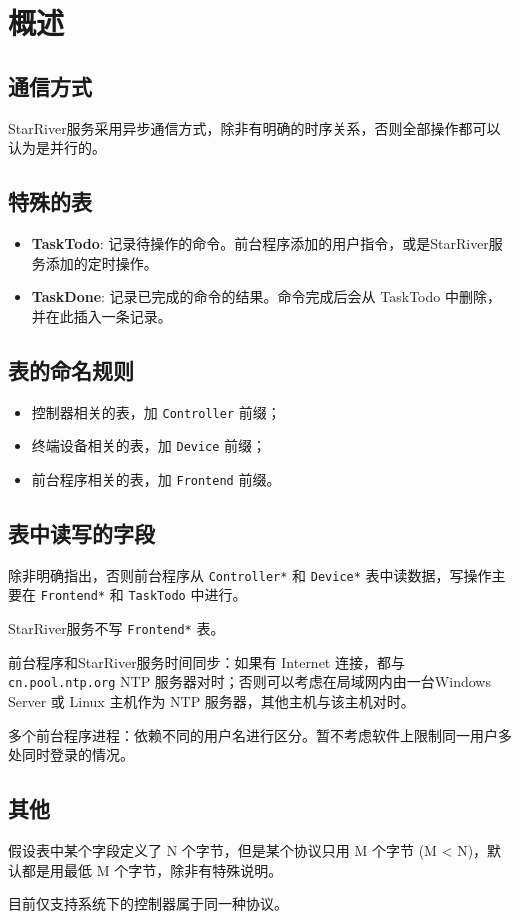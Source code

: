 \section{概述}\label{ux6982ux8ff0}

\subsection{通信方式}\label{ux901aux4fe1ux65b9ux5f0f}

StarRiver服务采用异步通信方式，除非有明确的时序关系，否则全部操作都可以认为是并行的。

\subsection{特殊的表}\label{ux7279ux6b8aux7684ux8868}

\begin{itemize}
\item
  \textbf{TaskTodo}:
  记录待操作的命令。前台程序添加的用户指令，或是StarRiver服务添加的定时操作。
\item
  \textbf{TaskDone}: 记录已完成的命令的结果。命令完成后会从 TaskTodo
  中删除，并在此插入一条记录。
\end{itemize}

\subsection{表的命名规则}\label{ux8868ux7684ux547dux540dux89c4ux5219}

\begin{itemize}
\itemsep1pt\parskip0pt
\item
  控制器相关的表，加 \texttt{Controller} 前缀；
\item
  终端设备相关的表，加 \texttt{Device} 前缀；
\item
  前台程序相关的表，加 \texttt{Frontend} 前缀。
\end{itemize}

\subsection{表中读写的字段}\label{ux8868ux4e2dux8bfbux5199ux7684ux5b57ux6bb5}

除非明确指出，否则前台程序从 \texttt{Controller*} 和 \texttt{Device*}
表中读数据，写操作主要在 \texttt{Frontend*} 和 \texttt{TaskTodo}
中进行。

StarRiver服务不写 \texttt{Frontend*} 表。

前台程序和StarRiver服务时间同步：如果有 Internet 连接，都与
\texttt{cn.pool.ntp.org} NTP
服务器对时；否则可以考虑在局域网内由一台Windows Server 或 Linux 主机作为
NTP 服务器，其他主机与该主机对时。

多个前台程序进程：依赖不同的用户名进行区分。暂不考虑软件上限制同一用户多处同时登录的情况。

\subsection{其他}\label{ux5176ux4ed6}

假设表中某个字段定义了 N 个字节，但是某个协议只用 M 个字节 (M
\textless{} N)，默认都是用最低 M 个字节，除非有特殊说明。

目前仅支持系统下的控制器属于同一种协议。
